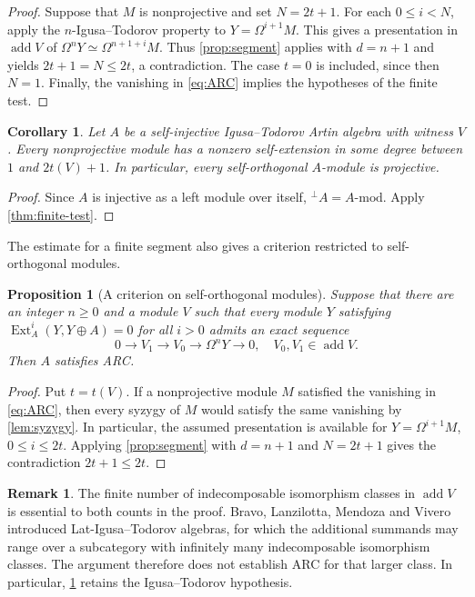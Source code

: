 \documentclass[a4paper,reqno]{amsart}
\numberwithin{equation}{section}
\newtheorem{cor}[thm]{Corollary}
\newtheorem{prop}[thm]{Proposition}
\theoremstyle{definition}
\newtheorem{rem}[thm]{Remark}
\DeclareMathOperator{\Ext}{Ext}
\DeclareMathOperator{\add}{add}
\newcommand{\modA}{A\text{-}\mathrm{mod}}
\newcommand{\perpA}{{}^{\perp}A}
\begin{document}
\begin{proof}
Suppose that $M$ is nonprojective and set $N=2t+1$. For each $0\leq i<N$, apply the $n$-Igusa--Todorov property to $Y=\Omega^{i+1}M$. This gives a presentation in $\add V$ of $\Omega^nY\simeq\Omega^{n+1+i}M$. Thus \cref{prop:segment} applies with $d=n+1$ and yields $2t+1=N\leq2t$, a contradiction. The case $t=0$ is included, since then $N=1$. Finally, the vanishing in \eqref{eq:ARC} implies the hypotheses of the finite test.
\end{proof}

\begin{cor}\label{cor:selfinjective}
Let $A$ be a self-injective Igusa--Todorov Artin algebra with witness $V$. Every nonprojective module has a nonzero self-extension in some degree between $1$ and $2t(V)+1$. In particular, every self-orthogonal $A$-module is projective.
\end{cor}

\begin{proof}
Since $A$ is injective as a left module over itself, $\perpA=\modA$. Apply \cref{thm:finite-test}.
\end{proof}

The estimate for a finite segment also gives a criterion restricted to self-orthogonal modules.

\begin{prop}[A criterion on self-orthogonal modules]\label{prop:orthogonal-IT}
Suppose that there are an integer $n\geq0$ and a module $V$ such that every module $Y$ satisfying $\Ext_A^i(Y,Y\oplus A)=0$ for all $i>0$ admits an exact sequence
\[
0\longrightarrow V_1\longrightarrow V_0\longrightarrow\Omega^nY\longrightarrow0,
\quad V_0,V_1\in\add V.
\]
Then $A$ satisfies ARC.
\end{prop}

\begin{proof}
Put $t=t(V)$. If a nonprojective module $M$ satisfied the vanishing in \eqref{eq:ARC}, then every syzygy of $M$ would satisfy the same vanishing by \cref{lem:syzygy}. In particular, the assumed presentation is available for $Y=\Omega^{i+1}M$, $0\leq i\leq2t$. Applying \cref{prop:segment} with $d=n+1$ and $N=2t+1$ gives the contradiction $2t+1\leq2t$.
\end{proof}

\begin{rem}\label{rem:lat-IT}
The finite number of indecomposable isomorphism classes in $\add V$ is essential to both counts in the proof. Bravo, Lanzilotta, Mendoza and Vivero \cite[Definition~5.1]{BLMV2021} introduced Lat-Igusa--Todorov algebras, for which the additional summands may range over a subcategory with infinitely many indecomposable isomorphism classes. The argument therefore does not establish ARC for that larger class. In particular, \cref{cor:selfinjective} retains the Igusa--Todorov hypothesis.
\end{rem}
\end{document}
